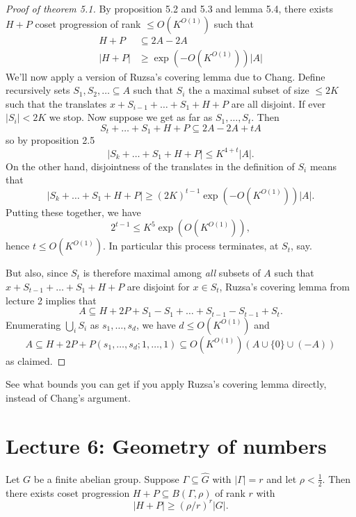 \documentclass[a4paper]{article}
\begin{document}
\begin{proof}[Proof of theorem 5.1]
  By proposition 5.2 and 5.3 and lemma 5.4, there exists \(H + P\) coset progression of rank \(\leq O(K^{O(1)})\) such that
  \begin{align*}
    H + P &\subseteq 2A - 2A \\
    |H + P| &\geq \exp(-O(K^{O(1)})) |A|
  \end{align*}
  We'll now apply a version of Ruzsa's covering lemma due to Chang. Define recursively sets \(S_1, S_2, \dots \subseteq A\) such that \(S_i\) the a maximal subset of size \(\leq 2K\) such that the translates \(x + S_{i - 1} + \dots + S_1 + H + P\) are all disjoint. If ever \(|S_i| < 2K\) we stop. Now suppose we get as far as \(S_1, \dots, S_t\). Then
  \[
    S_t + \dots + S_1 + H + P \subseteq 2A - 2A + tA
  \]
  so by proposition 2.5
  \[
    |S_k + \dots + S_1 + H + P| \leq K^{4 + t}|A|.
  \]
  On the other hand, disjointness of the translates in the definition of \(S_i\) means that
  \[
    |S_k + \dots + S_1 + H + P| \geq (2K)^{t - 1} \exp (-O(K^{O(1)})) |A|.
  \]
  Putting these together, we have
  \[
    2^{t - 1} \leq K^5 \exp (O(K^{O(1)})),
  \]
  hence \(t \leq O(K^{O(1)})\). In particular this process terminates, at \(S_t\), say.

  But also, since \(S_t\) is therefore maximal among \emph{all} subsets of \(A\) such that \(x + S_{t - 1} + \dots + S_1 + H + P\) are disjoint for \(x \in S_t\), Ruzsa's covering lemma from lecture 2 implies that
  \[
    A \subseteq H + 2P + S_1 - S_1 + \dots + S_{t - 1} - S_{t - 1} + S_t.
  \]
  Enumerating \(\bigcup_i S_i\) as \(s_1, \dots, s_d\), we have \(d \leq O(K^{O(1)})\) and
  \[
    A \subseteq H + 2P + P(s_1, \dots, s_d; 1, \dots, 1) \subseteq O(K^{O(1)}) (A \cup \{0\} \cup (-A))
  \]
  as claimed.
\end{proof}

\begin{ex}
  See what bounds you can get if you apply Ruzsa's covering lemma directly, instead of Chang's argument.
\end{ex}

\section*{Lecture 6: Geometry of numbers}

\begin{proposition}[prop 5.3]
  Let \(G\) be a finite abelian group. Suppose \(\Gamma \subseteq \hat G\) with \(|\Gamma| = r\) and let \(\rho < \frac{1}{2}\). Then there exists coset progression \(H + P \subseteq B(\Gamma, \rho)\) of rank \(r\) with
  \[
    |H + P| \geq (\rho/r)^r|G|.
  \]
\end{proposition}
\end{document}

